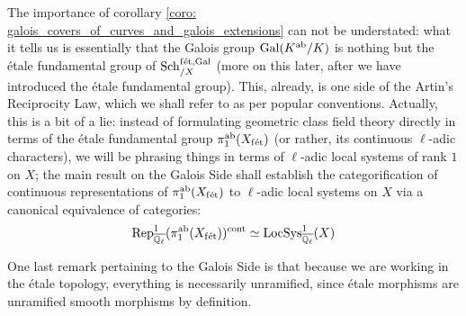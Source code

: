             The importance of corollary \ref{coro: galois_covers_of_curves_and_galois_extensions} can not be understated: what it tells us is essentially that the Galois group $\mathrm{Gal}(K^{\mathrm{ab}}/K)$ is nothing but the \'etale fundamental group of $\mathrm{Sch}_{/X}^{\mathrm{f\acute{e}t}, \mathrm{Gal}}$ (more on this later, after we have introduced the \'etale fundamental group). This, already, is one side of the Artin's Reciprocity Law, which we shall refer to as  per popular conventions. Actually, this is a bit of a lie: instead of formulating geometric class field theory directly in terms of the \'etale fundamental group $\pi_1^{\mathrm{ab}}(X_{\mathrm{f\acute{e}t}})$ (or rather, its continuous $\ell$-adic characters), we will be phrasing things in terms of $\ell$-adic local systems of rank $1$ on $X$; the main result on the Galois Side shall establish the categorification of continuous representations of $\pi_1^{\mathrm{ab}}(X_{\mathrm{f\acute{e}t}})$ to $\ell$-adic local systems on $X$ via a canonical equivalence of categories:
                $$\mathrm{Rep}^1_{\overline{\mathbb{Q}_{\ell}}}(\pi_1^{\mathrm{ab}}(X_{\mathrm{f\acute{e}t}}))^{\mathrm{cont}} \simeq \mathrm{LocSys}^1_{\overline{\mathbb{Q}_{\ell}}}(X)$$
            
            One last remark pertaining to the Galois Side is that because we are working in the \'etale topology, everything is necessarily unramified, since \'etale morphisms are unramified smooth morphisms by definition.
        
